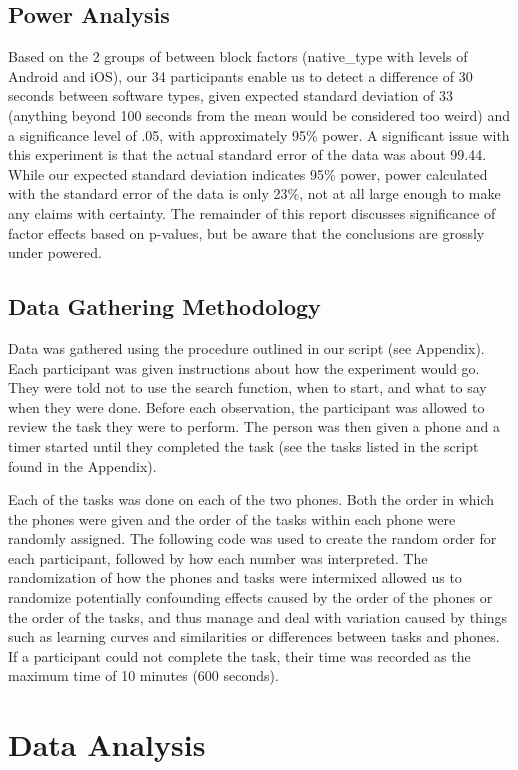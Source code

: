 \documentclass[conference]{IEEEtran}
\begin{document}
\subsection{Power Analysis}
Based on the 2 groups of between block factors (native\_type with levels of Android and iOS), our 34 participants enable us to detect a difference of 30 seconds between software types, given expected standard deviation of 33 (anything beyond 100 seconds from the mean would be considered too weird) and a significance level of .05, with approximately 95\% power. A significant issue with this experiment is that the actual standard error of the data was about 99.44. While our expected standard deviation indicates 95\% power, power calculated with the standard error of the data is only 23\%, not at all large enough to make any claims with certainty. The remainder of this report discusses significance of factor effects based on p-values, but be aware that the conclusions are grossly under powered.

\subsection{Data Gathering Methodology}
Data was gathered using the procedure outlined in our script (see Appendix). Each participant was given instructions about how the experiment would go. They were told not to use the search function, when to start, and what to say when they were done. Before each observation, the participant was allowed to review the task they were to perform. The person was then given a phone and a timer started until they completed the task (see the tasks listed in the script found in the Appendix).

Each of the tasks was done on each of the two phones. Both the order in which the phones were given and the order of the tasks within each phone were randomly assigned. The following code was used to create the random order for each participant, followed by how each number was interpreted. The randomization of how the phones and tasks were intermixed allowed us to randomize potentially confounding effects caused by the order of the phones or the order of the tasks, and thus manage and deal with variation caused by things such as learning curves and similarities or differences between tasks and phones. If a participant could not complete the task, their time was recorded as the maximum time of 10 minutes (600 seconds).


\section{Data Analysis}
\end{document}
